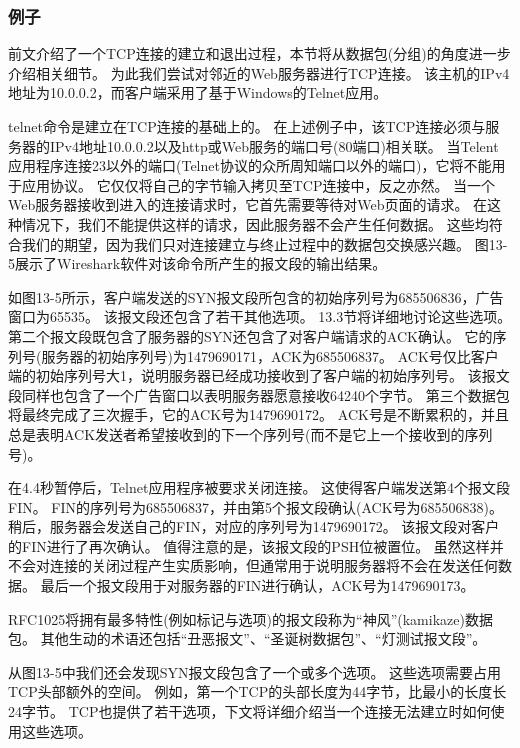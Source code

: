 \documentclass{../main.tex}{subfiles}
\begin{document}
\subsubsection{例子}
前文介绍了一个TCP连接的建立和退出过程，本节将从数据包(分组)的角度进一步介绍相关细节。
为此我们尝试对邻近的Web服务器进行TCP连接。
该主机的IPv4地址为10.0.0.2，而客户端采用了基于Windows的Telnet应用。

telnet命令是建立在TCP连接的基础上的。
在上述例子中，该TCP连接必须与服务器的IPv4地址10.0.0.2以及http或Web服务的端口号(80端口)相关联。
当Telent应用程序连接23以外的端口(Telnet协议的众所周知端口以外的端口)，它将不能用于应用协议。
它仅仅将自己的字节输入拷贝至TCP连接中，反之亦然。
当一个Web服务器接收到进入的连接请求时，它首先需要等待对Web页面的请求。
在这种情况下，我们不能提供这样的请求，因此服务器不会产生任何数据。
这些均符合我们的期望，因为我们只对连接建立与终止过程中的数据包交换感兴趣。
图13-5展示了Wireshark软件对该命令所产生的报文段的输出结果。

如图13-5所示，客户端发送的SYN报文段所包含的初始序列号为685506836，广告窗口为65535。
该报文段还包含了若干其他选项。
13.3节将详细地讨论这些选项。
第二个报文段既包含了服务器的SYN还包含了对客户端请求的ACK确认。
它的序列号(服务器的初始序列号)为1479690171，ACK为685506837。
ACK号仅比客户端的初始序列号大1，说明服务器已经成功接收到了客户端的初始序列号。
该报文段同样也包含了一个广告窗口以表明服务器愿意接收64240个字节。
第三个数据包将最终完成了三次握手，它的ACK号为1479690172。
ACK号是不断累积的，并且总是表明ACK发送者希望接收到的下一个序列号(而不是它上一个接收到的序列号)。

在4.4秒暂停后，Telnet应用程序被要求关闭连接。
这使得客户端发送第4个报文段FIN。
FIN的序列号为685506837，并由第5个报文段确认(ACK号为685506838)。
稍后，服务器会发送自己的FIN，对应的序列号为1479690172。
该报文段对客户的FIN进行了再次确认。
值得注意的是，该报文段的PSH位被置位。
虽然这样并不会对连接的关闭过程产生实质影响，但通常用于说明服务器将不会在发送任何数据。
最后一个报文段用于对服务器的FIN进行确认，ACK号为1479690173。
\begin{tcolorbox}[title={注意}]
  RFC1025将拥有最多特性(例如标记与选项)的报文段称为``神风''(kamikaze)数据包。
  其他生动的术语还包括``丑恶报文''、``圣诞树数据包''、``灯测试报文段''。
\end{tcolorbox}
从图13-5中我们还会发现SYN报文段包含了一个或多个选项。
这些选项需要占用TCP头部额外的空间。
例如，第一个TCP的头部长度为44字节，比最小的长度长24字节。
TCP也提供了若干选项，下文将详细介绍当一个连接无法建立时如何使用这些选项。
\end{document}
